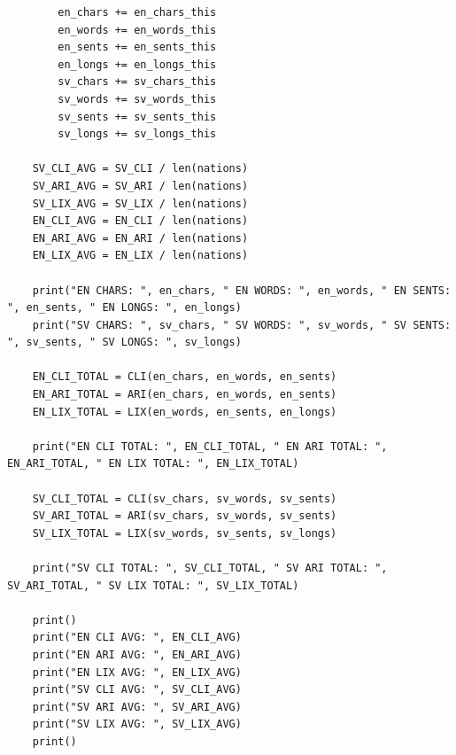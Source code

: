 \documentclass[a4paper]{article}
\begin{document}
\begin{verbatim}
        en_chars += en_chars_this
        en_words += en_words_this
        en_sents += en_sents_this
        en_longs += en_longs_this
        sv_chars += sv_chars_this
        sv_words += sv_words_this
        sv_sents += sv_sents_this
        sv_longs += sv_longs_this
        
    SV_CLI_AVG = SV_CLI / len(nations)
    SV_ARI_AVG = SV_ARI / len(nations)
    SV_LIX_AVG = SV_LIX / len(nations)
    EN_CLI_AVG = EN_CLI / len(nations)
    EN_ARI_AVG = EN_ARI / len(nations)
    EN_LIX_AVG = EN_LIX / len(nations)
    
    print("EN CHARS: ", en_chars, " EN WORDS: ", en_words, " EN SENTS: ", en_sents, " EN LONGS: ", en_longs)
    print("SV CHARS: ", sv_chars, " SV WORDS: ", sv_words, " SV SENTS: ", sv_sents, " SV LONGS: ", sv_longs)
  
    EN_CLI_TOTAL = CLI(en_chars, en_words, en_sents)
    EN_ARI_TOTAL = ARI(en_chars, en_words, en_sents)
    EN_LIX_TOTAL = LIX(en_words, en_sents, en_longs)
    
    print("EN CLI TOTAL: ", EN_CLI_TOTAL, " EN ARI TOTAL: ", EN_ARI_TOTAL, " EN LIX TOTAL: ", EN_LIX_TOTAL)

    SV_CLI_TOTAL = CLI(sv_chars, sv_words, sv_sents)
    SV_ARI_TOTAL = ARI(sv_chars, sv_words, sv_sents)
    SV_LIX_TOTAL = LIX(sv_words, sv_sents, sv_longs)
    
    print("SV CLI TOTAL: ", SV_CLI_TOTAL, " SV ARI TOTAL: ", SV_ARI_TOTAL, " SV LIX TOTAL: ", SV_LIX_TOTAL)
    
    print()
    print("EN CLI AVG: ", EN_CLI_AVG)
    print("EN ARI AVG: ", EN_ARI_AVG)
    print("EN LIX AVG: ", EN_LIX_AVG)
    print("SV CLI AVG: ", SV_CLI_AVG)
    print("SV ARI AVG: ", SV_ARI_AVG)
    print("SV LIX AVG: ", SV_LIX_AVG)
    print()
\end{verbatim}

\newpage
\end{document}
